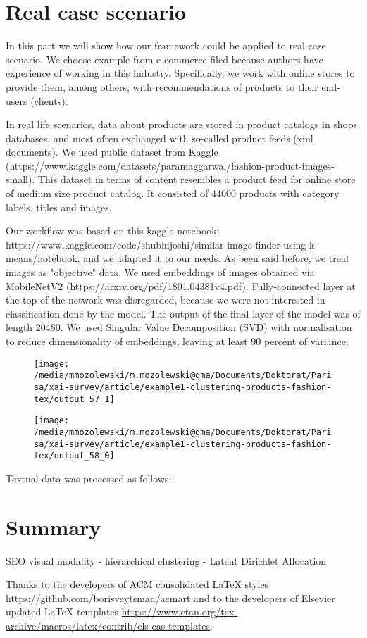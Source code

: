 \documentclass[
]{ceurart}
\begin{document}
\section{Real case scenario}
In this part we will show how our framework could be applied to real case scenario.
We choose example from e-commerce filed because authors have experience of working in this industry.
Specifically, we work with online stores to provide them, among others, with recommendations of products to their end-users (clients).

In real life scenarios, data about products are stored in product catalogs in shops databases, and most often exchanged with so-called product feeds (xml documents).
We used public dataset from Kaggle (https://www.kaggle.com/datasets/paramaggarwal/fashion-product-images-small).
This dataset in terms of content resembles a product feed for online store of medium size product catalog.
It consisted of 44000 products with category labels, titles and images.

Our workflow was based on this kaggle notebook: https://www.kaggle.com/code/shubhijoshi/similar-image-finder-using-k-means/notebook, and we adapted it to our needs.
As been said before, we treat images as "objective" data.
We used embeddings of images obtained via MobileNetV2 (https://arxiv.org/pdf/1801.04381v4.pdf).
Fully-connected layer at the top of the network was disregarded, because we were not interested in classification done by the model.
The output of the final layer of the model was of length 20480.
We used Singular Value Decomposition (SVD) with normalisation to reduce dimensionality of embeddings, leaving at least 90 percent of variance.

\begin{figure}
    \centering
    \texttt{[image: /media/mmozolewski/m.mozolewski@gma/Documents/Doktorat/Parisa/xai-survey/article/example1-clustering-products-fashion-tex/output\_57\_1]}
    \caption{}
    \label{fig:}
\end{figure}
\begin{figure}
    \centering
    \texttt{[image: /media/mmozolewski/m.mozolewski@gma/Documents/Doktorat/Parisa/xai-survey/article/example1-clustering-products-fashion-tex/output\_58\_0]}
    \caption{}
    \label{fig:}
\end{figure}

Textual data was processed as follows:


\section{Summary}
SEO
visual modality
- hierarchical clustering
- Latent Dirichlet Allocation

\begin{acknowledgments}
  Thanks to the developers of ACM consolidated LaTeX styles
  \url{https://github.com/borisveytsman/acmart} and to the developers
  of Elsevier updated \LaTeX{} templates
  \url{https://www.ctan.org/tex-archive/macros/latex/contrib/els-cas-templates}.  
\end{acknowledgments}


\end{document}
